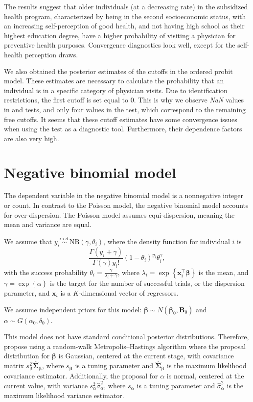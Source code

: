 The results suggest that older individuals (at a decreasing rate) in the subsidized health program, characterized by being in the second socioeconomic status, with an increasing self-perception of good health, and not having high school as their highest education degree, have a higher probability of visiting a physician for preventive health purposes. Convergence diagnostics look well, except for the self-health perception draws.

We also obtained the posterior estimates of the cutoffs in the ordered probit model. These estimates are necessary to calculate the probability that an individual is in a specific category of physician visits. Due to identification restrictions, the first cutoff is set equal to 0. This is why we observe \textit{NaN} values in \cite{Geweke1992} and \cite{Heidelberger1983} tests, and only four values in the \cite{Raftery1992} test, which correspond to the remaining free cutoffs. It seems that these cutoff estimates have some convergence issues when using the \cite{Raftery1992} test as a diagnostic tool. Furthermore, their dependence factors are also very high.

\section{Negative binomial model}\label{sec67}

The dependent variable in the negative binomial model is a nonnegative integer or count. In contrast to the Poisson model, the negative binomial model accounts for over-dispersion. The Poisson model assumes equi-dispersion, meaning the mean and variance are equal.

We assume that $y_i \stackrel{i.i.d.} {\sim} \text{NB}(\gamma, \theta_i)$, where the density function for individual $i$ is 
\[
\frac{\Gamma(y_i + \gamma)}{\Gamma(\gamma) y_i!} (1 - \theta_i)^{y_i} \theta_i^{\gamma},
\]
with the success probability $\theta_i = \frac{\gamma}{\lambda_i + \gamma}$, where $\lambda_i = \exp\left\{\bm{x}_i^{\top} \bm{\beta}\right\}$ is the mean, and $\gamma = \exp\left\{\alpha \right\}$ is the target for the number of successful trials, or the dispersion parameter, and $\bm x_i$ is a $K$-dimensional vector of regressors.

We assume independent priors for this model: $\bm{\beta} \sim N(\bm{\beta}_0, \bm{B}_0)$ and $\alpha \sim G(\alpha_0, \delta_0)$.

This model does not have standard conditional posterior distributions. Therefore, \cite{rossi2012bayesian} propose using a random-walk Metropolis–Hastings algorithm where the proposal distribution for $\bm{\beta}$ is Gaussian, centered at the current stage, with covariance matrix $s_{\bm{\beta}}^2 \hat{\bm{\Sigma}}_{\bm{\beta}}$, where $s_{\bm{\beta}}$ is a tuning parameter and $\hat{\bm{\Sigma}}_{\bm{\beta}}$ is the maximum likelihood covariance estimator. Additionally, the proposal for $\alpha$ is normal, centered at the current value, with variance $s_{\alpha}^2 \hat{\sigma}_{\alpha}^2$, where $s_{\alpha}$ is a tuning parameter and $\hat{\sigma}_{\alpha}^2$ is the maximum likelihood variance estimator.\\

